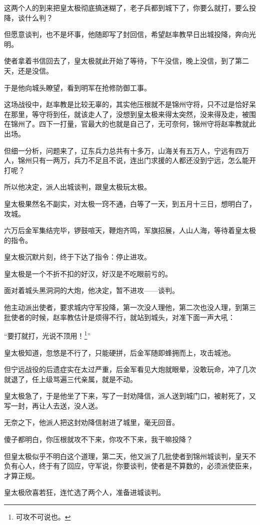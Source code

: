 \begin{multicols}{\theparacolNo}
		这两个人的到来把皇太极彻底搞迷糊了，老子兵都到城下了，你要么就打，要么投降，谈什么判？

		但愿意谈判，也不是坏事，他随即写了封回信，希望赵率教早日出城投降，奔向光明。

		使者拿着书信回去了，皇太极就此开始了等待，下午没信，晚上没信，到了第二天，还是没信。

		于是他向城头瞭望，看到明军在抢修防御工事。

		这场战役中，赵率教是比较无辜的，其实他压根就不是锦州守将，只不过是恰好呆在那里，等守将到任，就该走人了，没想到皇太极来得太突然，没来得及走，被围在锦州了。四下一打量，官最大的也就是自己了，无可奈何，锦州守将赵率教就此出场。

		但细一分析，问题来了，辽东兵力总共有十多万，山海关有五万人，宁远有四万人，锦州只有一两万，兵力不足且不说，连出门求援的人都还没到宁远，怎么能开打呢？

		所以他决定，派人出城谈判，跟皇太极玩太极。

		皇太极果然名不副实，对太极一窍不通，白等了一天，到五月十三日，想明白了，攻城。

		六万后金军集结完毕，锣鼓喧天，鞭炮齐鸣，军旗招展，人山人海，等待着皇太极的指令。

		皇太极沉默片刻，终于下达了指令：停止进攻。

		皇太极是一个不折不扣的好汉，好汉是不吃眼前亏的。

		面对着城头黑洞洞的大炮，他决定，暂不进攻——谈判。

		他主动派出使者，要求城内守军投降，第一次没人理他，第二次也没人理，到第三批使者的时候，赵率教估计是烦得不行，就站到城头，对准下面一声大吼：

		“要打就打，光说不顶用！\footnote{可攻不可说也。}”

		皇太极知道，忽悠是不行了，只能硬拼，后金军随即蜂拥而上，攻击城池。

		但宁远战役的后遗症实在太过严重，后金军看见大炮就眼晕，没敢玩命，冲了几次就退了，任上级骂遍三代亲属，就是不动。

		皇太极急了，于是他坐了下来，写了一封劝降信，派人送到城门口，被射死了，又写一封，再让人去送，没人送。

		无奈之下，他派人把这封劝降信射进了城里，毫无回音。

		傻子都明白，你压根就攻不下来，你攻不下来，我干嘛投降？

		但皇太极似乎不明白这个道理，第二天，他又派了几批使者到锦州城谈判，皇天不负有心人，终于有了回应，守军说，你要谈判，使者是不算数的，必须派使臣来，才算正规。

		皇太极欣喜若狂，连忙选了两个人，准备进城谈判。


\end{multicols}

